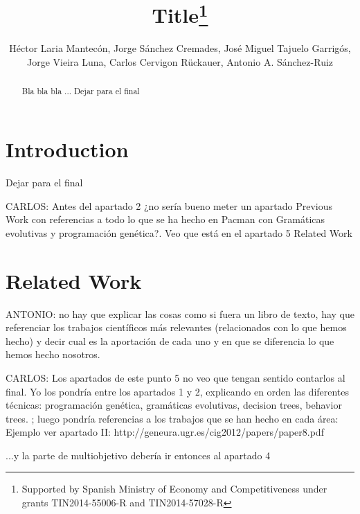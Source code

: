 \documentclass{llncs}
\title{Title\thanks{Supported by Spanish Ministry of Economy and Competitiveness under grants TIN2014-55006-R and TIN2014-57028-R}
}
\author{Héctor Laria Mantecón, Jorge Sánchez Cremades, José Miguel Tajuelo Garrigós, Jorge Vieira Luna, Carlos Cervigon Rückauer, Antonio A. S\'{a}nchez-Ruiz}
\institute{
	Dep. Ingenier\'{\i}a del Software e Inteligencia Artificial \\
	Universidad Complutense de Madrid (Spain) \\
	\email{\{hlaria, jorsan06, jtajuelo, jovieira, ccervigon, antsanch\}@ucm.es}
}
\begin{document}
\maketitle

%
%
\begin{abstract}
Bla bla bla ... 
Dejar para el final

\end{abstract}

%
\section{Introduction}
\label{sec:intro}
%

Dejar para el final

{\color{red}CARLOS: Antes del apartado 2 ¿no sería bueno meter un apartado Previous Work con referencias a todo lo que se ha hecho en Pacman con Gramáticas evolutivas y programación genética?. Veo que está en el apartado 5 Related Work}

%
\section{Related Work}
\label{sec:relatedWork}
%

{\color{red}ANTONIO: no hay que explicar las cosas como si fuera un libro de texto, hay que referenciar los trabajos científicos más relevantes (relacionados con lo que hemos hecho) y decir cual es la aportación de cada uno y en que se diferencia lo que hemos hecho nosotros.}

{\color{red}CARLOS: Los apartados de este punto 5 no veo que tengan sentido contarlos al final. Yo los pondría entre los apartados 1 y 2, explicando en orden las diferentes técnicas: programación genética, gramáticas evolutivas, decision trees, behavior trees. ; luego pondría referencias a los trabajos que se han hecho en cada área: Ejemplo ver apartado II: http://geneura.ugr.es/cig2012/papers/paper8.pdf

...y la parte de multiobjetivo debería ir entonces al apartado 4}
\end{document}
